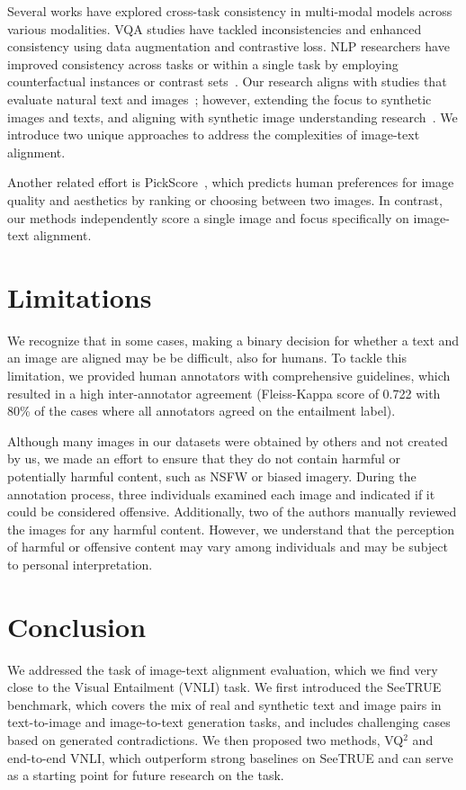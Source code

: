 \documentclass{article}
\newcommand{\datasetname}[0]{SeeTRUE\xspace}
\newcommand{\VQSQR}[0]{VQ$^2$\xspace}
\begin{document}
Several works have explored cross-task consistency in multi-modal models across various modalities. VQA studies have tackled inconsistencies and enhanced consistency using data augmentation and contrastive loss. NLP researchers have improved consistency across tasks or within a single task by employing counterfactual instances or contrast sets~\citep{dagan2010recognizing,SNLI}. Our research aligns with studies that evaluate natural text and images~\citep{maharana2023exposing}; however, extending the focus to synthetic images and texts, and aligning with synthetic image understanding research~\citep{gokhale2022benchmarking, li2022dall, bitton2023breaking, wu2023better, borji2022generated, stockl2022evaluating}. We introduce two unique approaches to address the complexities of image-text alignment.

Another related effort is PickScore~\cite{kirstain2023pickapic}, which predicts human preferences for image quality and aesthetics by ranking or choosing between two images. In contrast, our methods independently score a single image and focus specifically on image-text alignment.  




\section{Limitations}
\label{sec:limitations}
We recognize that in some cases, making a binary decision for whether a text and an image are aligned may be be difficult, also for humans. To tackle this limitation, we provided human annotators with comprehensive guidelines, which resulted in a high inter-annotator agreement (Fleiss-Kappa score of 0.722 with 80\% of the cases where all annotators agreed on the entailment label). 

Although many images in our datasets were obtained by others and not created by us, we made an effort to ensure that they do not contain harmful or potentially harmful content, such as NSFW or biased imagery. During the annotation process, three individuals examined each image and indicated if it could be considered offensive. Additionally, two of the authors manually reviewed the images for any harmful content. However, we understand that the perception of harmful or offensive content may vary among individuals and may be subject to personal interpretation. 
\section{Conclusion}
\label{sec:conclusion}
We addressed the task of image-text alignment evaluation, which we find very close to the Visual Entailment (VNLI) task. We first introduced the \datasetname benchmark, which covers the mix of real and synthetic text and image pairs in text-to-image and image-to-text generation tasks, and includes challenging cases based on generated contradictions. We then proposed two methods, \VQSQR and end-to-end VNLI, which outperform strong baselines on \datasetname and can serve as a starting point for future research on the task.
\end{document}
